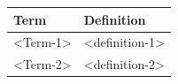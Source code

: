 \documentclass[]{article}
\begin{document}
\begin{longtable}[]{@{}ll@{}}
\toprule
\begin{minipage}[b]{0.47\columnwidth}\raggedright
Term\strut
\end{minipage} & \begin{minipage}[b]{0.47\columnwidth}\raggedright
Definition\strut
\end{minipage}\tabularnewline
\midrule
\endhead
\begin{minipage}[t]{0.47\columnwidth}\raggedright
\textless{}Term-1\textgreater{}\strut
\end{minipage} & \begin{minipage}[t]{0.47\columnwidth}\raggedright
\textless{}definition-1\textgreater{}\strut
\end{minipage}\tabularnewline
\begin{minipage}[t]{0.47\columnwidth}\raggedright
\textless{}Term-2\textgreater{}\strut
\end{minipage} & \begin{minipage}[t]{0.47\columnwidth}\raggedright
\textless{}definition-2\textgreater{}\strut
\end{minipage}\tabularnewline
\bottomrule
\end{longtable}
\end{document}
